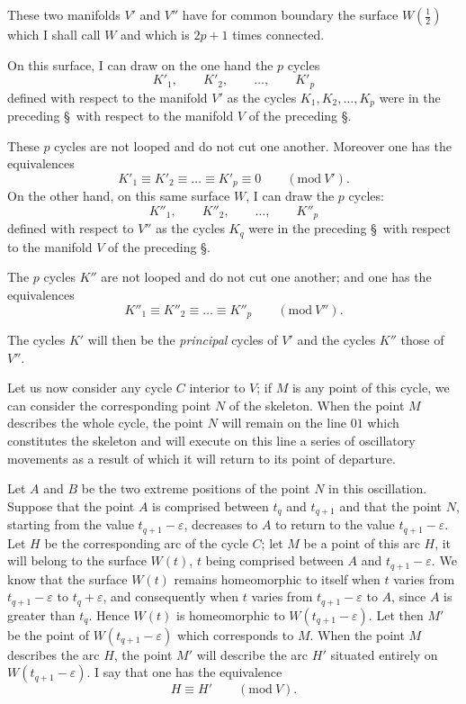 \documentclass{article}
\begin{document}
These two manifolds $V'$ and $V''$ have for common boundary the surface $W\left(\frac{1}{2}\right)$ which I shall call $W$ and which is $2p + 1$ times connected.

On this surface, I can draw on the one hand the $p$ cycles
\[ K'_{1}, \qquad K'_{2}, \qquad \ldots, \qquad K'_{p} \]
defined with respect to the manifold $V'$ as the cycles $K_{1}, K_{2}, \ldots, K_{p}$ were in the preceding \S\ with respect to the manifold $V$ of the preceding \S.

These $p$ cycles are not looped and do not cut one another. Moreover one has the equivalences
\[ K'_{1} \equiv K'_{2} \equiv \ldots \equiv K'_{p} \equiv 0 \qquad (\text{mod}\ V'). \tag{1} \]
On the other hand, on this same surface $W$, I can draw the $p$ cycles:
\[ K''_{1}, \qquad K''_{2}, \qquad \ldots, \qquad K''_{p} \]
defined with respect to $V''$ as the cycles $K_{q}$ were in the preceding \S\ with respect to the manifold $V$ of the preceding \S.


The $p$ cycles $K''$ are not looped and do not cut one another; and one has the equivalences
\[ K''_{1} \equiv K''_{2} \equiv \ldots \equiv K''_{p} \qquad (\text{mod}\ V''). \tag{2} \]

The cycles $K'$ will then be the \emph{principal} cycles of $V'$ and the cycles $K''$ those of $V''$.

Let us now consider any cycle $C$ interior to $V$; if $M$ is any point of this cycle, we can consider the corresponding point $N$ of the skeleton. When the point $M$ describes the whole cycle, the point $N$ will remain on the line $01$ which constitutes the skeleton and will execute on this line a series of oscillatory movements as a result of which it will return to its point of departure.

Let $A$ and $B$ be the two extreme positions of the point $N$ in this oscillation. Suppose that the point $A$ is comprised between $t_{q}$ and $t_{q+1}$ and that the point $N$, starting from the value $t_{q+1} - \varepsilon$, decreases to $A$ to return to the value $t_{q+1} - \varepsilon$. Let $H$ be the corresponding arc of the cycle $C$; let $M$ be a point of this arc $H$, it will belong to the surface $W(t)$, $t$ being comprised between $A$ and $t_{q+1} - \varepsilon$. We know that the surface $W(t)$ remains homeomorphic to itself when $t$ varies from $t_{q+1} - \varepsilon$ to $t_{q} + \varepsilon$, and consequently when $t$ varies from $t_{q+1} - \varepsilon$ to $A$, since $A$ is greater than $t_{q}$. Hence $W(t)$ is homeomorphic to $W(t_{q+1} - \varepsilon)$. Let then $M'$ be the point of $W(t_{q+1} - \varepsilon)$ which corresponds to $M$. When the point $M$ describes the arc $H$, the point $M'$ will describe the arc $H'$ situated entirely on $W(t_{q+1} - \varepsilon)$. I say that one has the equivalence
\[ H \equiv H' \qquad (\text{mod}\ V). \]
\end{document}
